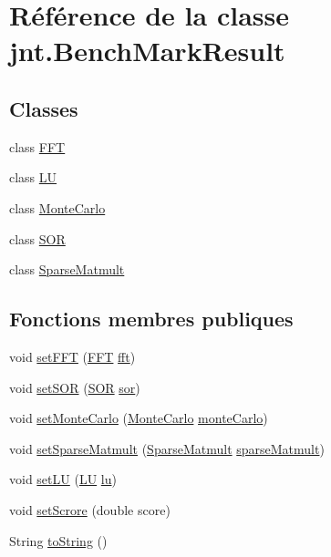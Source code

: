 \hypertarget{classjnt_1_1BenchMarkResult}{\section{Référence de la classe jnt.\-Bench\-Mark\-Result}
\label{classjnt_1_1BenchMarkResult}
}
\subsection*{Classes}
\begin{DoxyCompactItemize}
\item 
class \hyperlink{classjnt_1_1BenchMarkResult_1_1FFT}{F\-F\-T}
\item 
class \hyperlink{classjnt_1_1BenchMarkResult_1_1LU}{L\-U}
\item 
class \hyperlink{classjnt_1_1BenchMarkResult_1_1MonteCarlo}{Monte\-Carlo}
\item 
class \hyperlink{classjnt_1_1BenchMarkResult_1_1SOR}{S\-O\-R}
\item 
class \hyperlink{classjnt_1_1BenchMarkResult_1_1SparseMatmult}{Sparse\-Matmult}
\end{DoxyCompactItemize}
\subsection*{Fonctions membres publiques}
\begin{DoxyCompactItemize}
\item 
void \hyperlink{classjnt_1_1BenchMarkResult_a0045bf62b5b5d7a0814779b6ad798800}{set\-F\-F\-T} (\hyperlink{classjnt_1_1BenchMarkResult_1_1FFT}{F\-F\-T} \hyperlink{classjnt_1_1BenchMarkResult_a4ccbb09fa780dd422598546e86c845d7}{fft})
\item 
void \hyperlink{classjnt_1_1BenchMarkResult_af84c3e1f64ba2cef7fbe5756cce7454d}{set\-S\-O\-R} (\hyperlink{classjnt_1_1BenchMarkResult_1_1SOR}{S\-O\-R} \hyperlink{classjnt_1_1BenchMarkResult_a159025733607bd514927639795a47971}{sor})
\item 
void \hyperlink{classjnt_1_1BenchMarkResult_a15deedb34ecfdfb1bd5ee588c9a5c612}{set\-Monte\-Carlo} (\hyperlink{classjnt_1_1BenchMarkResult_1_1MonteCarlo}{Monte\-Carlo} \hyperlink{classjnt_1_1BenchMarkResult_a9f32de31bdbd4ecdf9ea3832825e0ba8}{monte\-Carlo})
\item 
void \hyperlink{classjnt_1_1BenchMarkResult_a9dc60916021b2fa2a0c14df14f679358}{set\-Sparse\-Matmult} (\hyperlink{classjnt_1_1BenchMarkResult_1_1SparseMatmult}{Sparse\-Matmult} \hyperlink{classjnt_1_1BenchMarkResult_abd6ec31f144598923f60d2cc0040df95}{sparse\-Matmult})
\item 
void \hyperlink{classjnt_1_1BenchMarkResult_a8345a1091a25eb9ef91eca88ddd7bce7}{set\-L\-U} (\hyperlink{classjnt_1_1BenchMarkResult_1_1LU}{L\-U} \hyperlink{classjnt_1_1BenchMarkResult_a615ece215df7fa40fa3de24fb62a8d7c}{lu})
\item 
void \hyperlink{classjnt_1_1BenchMarkResult_a7fafc6b9c2bd5b2e6777e4fe2013b539}{set\-Scrore} (double score)
\item 
String \hyperlink{classjnt_1_1BenchMarkResult_a29d58433604078d4c1f205f9dac46930}{to\-String} ()
\end{DoxyCompactItemize}
